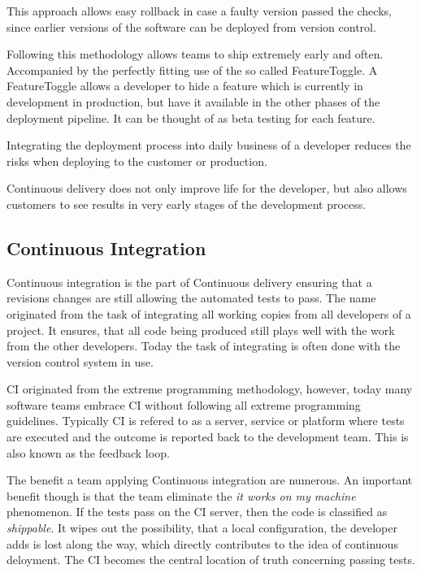 This approach allows easy rollback in case a faulty version passed the checks,
since earlier versions of the software can be deployed from version control.

Following this methodology allows teams to ship extremely early and often.
Accompanied by the perfectly fitting use of the so called FeatureToggle. A
FeatureToggle allows a developer to hide a feature which is currently in
development in production, but have it available in the other phases of the
deployment pipeline. It can be thought of as beta testing for each feature.

Integrating the deployment process into daily business of a developer reduces
the risks when deploying to the customer or production.

Continuous delivery does not only improve life for the developer, but also
allows customers to see results in very early stages of the development
process.

\subsection{Continuous Integration}

Continuous integration is the part of Continuous delivery ensuring that a
revisions changes are still allowing the automated tests to pass. The name
originated from the task of integrating all working copies from all developers
of a project. It ensures, that all code being produced still plays well with
the work from the other developers. Today the task of integrating is often done
with the version control system in use.

CI originated from the extreme programming methodology, however, today many
software teams embrace CI without following all extreme programming guidelines.
Typically CI is refered to as a server, service or platform where tests are
executed and the outcome is reported back to the development team. This is also
known as the feedback loop.

The benefit a team applying Continuous integration are numerous. An important
benefit though is that the team eliminate the \textit{it works on my machine}
phenomenon. If the tests pass on the CI server, then the code is classified as
\textit{shippable}. It wipes out the possibility, that a local configuration,
the developer adds is lost along the way, which directly contributes to the
idea of continuous deloyment. The CI becomes the central location of truth
concerning passing tests.

